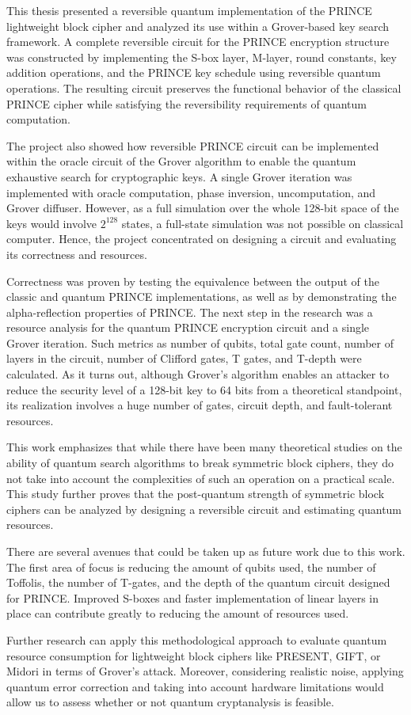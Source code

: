 \documentclass[11pt,a4paper]{article}
\begin{document}
This thesis presented a reversible quantum implementation of the PRINCE lightweight block cipher and analyzed its use within a Grover-based key search framework. A complete reversible circuit for the PRINCE encryption structure was constructed by implementing the S-box layer, M-layer, round constants, key addition operations, and the PRINCE key schedule using reversible quantum operations. The resulting circuit preserves the functional behavior of the classical PRINCE cipher while satisfying the reversibility requirements of quantum computation.

The project also showed how reversible PRINCE circuit can be implemented within the oracle circuit of the Grover algorithm to enable the quantum exhaustive search for cryptographic keys. A single Grover iteration was implemented with oracle computation, phase inversion, uncomputation, and Grover diffuser. However, as a full simulation over the whole 128-bit space of the keys would involve $2^{128}$ states, a full-state simulation was not possible on classical computer. Hence, the project concentrated on designing a circuit and evaluating its correctness and resources.

Correctness was proven by testing the equivalence between the output of the classic and quantum PRINCE implementations, as well as by demonstrating the alpha-reflection properties of PRINCE. The next step in the research was a resource analysis for the quantum PRINCE encryption circuit and a single Grover iteration. Such metrics as number of qubits, total gate count, number of layers in the circuit, number of Clifford gates, T gates, and T-depth were calculated. As it turns out, although Grover's algorithm enables an attacker to reduce the security level of a 128-bit key to 64 bits from a theoretical standpoint, its realization involves a huge number of gates, circuit depth, and fault-tolerant resources.

This work emphasizes that while there have been many theoretical studies on the ability of quantum search algorithms to break symmetric block ciphers, they do not take into account the complexities of such an operation on a practical scale. This study further proves that the post-quantum strength of symmetric block ciphers can be analyzed by designing a reversible circuit and estimating quantum resources.

There are several avenues that could be taken up as future work due to this work. The first area of focus is reducing the amount of qubits used, the number of Toffolis, the number of T-gates, and the depth of the quantum circuit designed for PRINCE. Improved S-boxes and faster implementation of linear layers in place can contribute greatly to reducing the amount of resources used.

Further research can apply this methodological approach to evaluate quantum resource consumption for lightweight block ciphers like PRESENT, GIFT, or Midori in terms of Grover’s attack. Moreover, considering realistic noise, applying quantum error correction and taking into account hardware limitations would allow us to assess whether or not quantum cryptanalysis is feasible.




\end{document}
